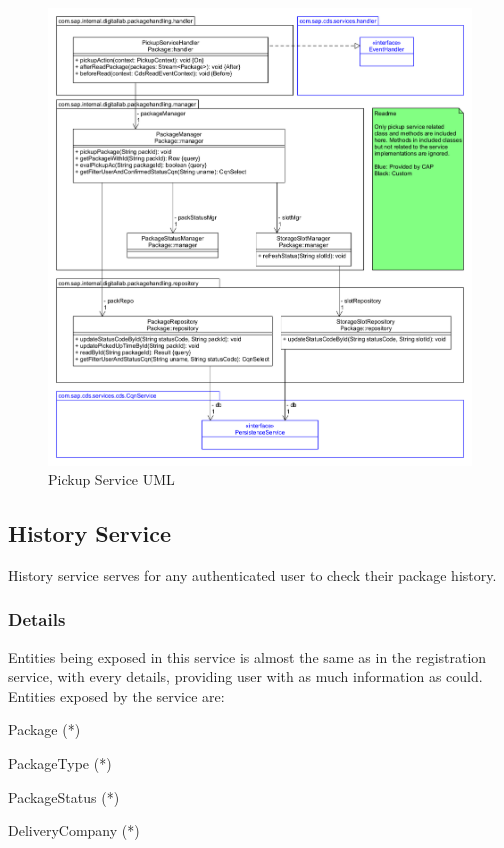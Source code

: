\begin{figure}[!h]
    \centering
    \includegraphics[width=1\linewidth]{images/service_class_diagrams/pickup_service_class_diagram.png}
    \caption{Pickup Service UML}
    \label{fig:pickup_service_uml}
\end{figure}
\pagebreak

\subsection{History Service}
History service serves for any authenticated user to check their package history.

\subsubsection{Details}

Entities being exposed in this service is almost the same as in the registration service, with every details, providing user with as much information as could. Entities exposed by the service are:
\begin{compactenum}
	\item Package (*)
    \item PackageType (*)
    \item PackageStatus (*)
    \item DeliveryCompany (*)
\end{compactenum}

